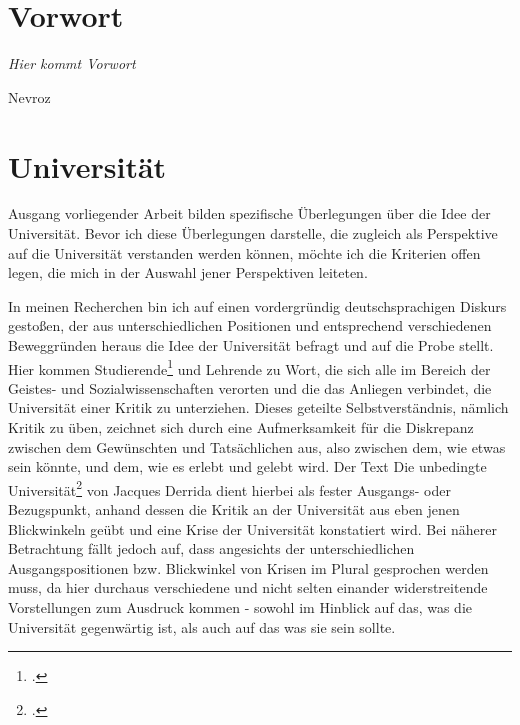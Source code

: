 \section{Vorwort}

\setlength{\epigraphwidth}{0.7\textwidth}

\epigraph{\textit{Hier kommt Vorwort}}{Nevroz \footnotemark}

\section{Universität}

Ausgang vorliegender Arbeit bilden spezifische Überlegungen über die Idee der
Universität. Bevor ich diese Überlegungen darstelle, die zugleich als
Perspektive auf die Universität verstanden werden können, möchte ich die
Kriterien offen legen, die mich in der Auswahl jener Perspektiven leiteten.

In meinen Recherchen bin ich auf einen vordergründig deutschsprachigen Diskurs
gestoßen, der aus unterschiedlichen Positionen und entsprechend verschiedenen
Beweggründen heraus die Idee der Universität befragt und auf die Probe stellt.
Hier kommen Studierende\footnotemark \footcitetext{lohman} und Lehrende\footnotemark {} zu Wort, die sich alle im Bereich der Geistes- und
  Sozialwissenschaften verorten und die das Anliegen verbindet, die Universität
  einer Kritik zu unterziehen. Dieses geteilte Selbstverständnis, nämlich
  Kritik zu üben, zeichnet sich durch eine Aufmerksamkeit für die Diskrepanz
  zwischen dem Gewünschten und Tatsächlichen aus, also zwischen dem, wie etwas
  sein könnte, und dem, wie es erlebt und gelebt wird.\footnotemark
   Der Text \glqq Die
  unbedingte Universität\grqq\footnotemark \footcitetext{derrida} von Jacques Derrida dient hierbei als fester
  Ausgangs- oder Bezugspunkt, anhand dessen die Kritik an der Universität aus
  eben jenen Blickwinkeln geübt und eine Krise der Universität konstatiert
  wird.  Bei näherer Betrachtung fällt jedoch auf, dass angesichts der
  unterschiedlichen Ausgangspositionen bzw. Blickwinkel von Krisen im Plural
  gesprochen werden muss, da hier durchaus verschiedene und nicht selten
  einander widerstreitende Vorstellungen zum Ausdruck kommen - sowohl im
  Hinblick auf das, was die Universität gegenwärtig ist, als auch auf das was sie sein
  sollte. \\

